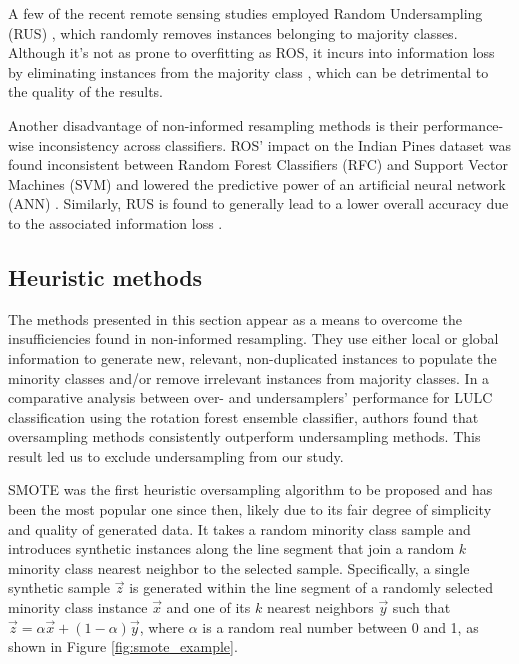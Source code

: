 \documentclass[information,article,submit,moreauthors,pdftex]{Definitions/mdpi}
\begin{document}
\begin{paracol}{2}
A few of the recent remote sensing studies employed Random Undersampling (RUS)
\citep{Ferreira2019}, which randomly removes instances belonging to majority
classes. Although it's not as prone to overfitting as ROS, it incurs into
information loss by eliminating instances from the majority class
\citep{Feng2019}, which can be detrimental to the quality of the results.

Another disadvantage of non-informed resampling methods is their
performance-wise inconsistency across classifiers. ROS' impact on the Indian
Pines dataset was found inconsistent between Random Forest Classifiers (RFC)
and Support Vector Machines (SVM) and lowered the predictive power of an
artificial neural network (ANN) \citep{Maxwell2018}. Similarly, RUS is found to
generally lead to a lower overall accuracy due to the associated information
loss \citep{Maxwell2018}.

\subsection{Heuristic methods}

The methods presented in this section appear as a means to overcome the
insufficiencies found in non-informed resampling. They use either local or
global information to generate new, relevant, non-duplicated instances to
populate the minority classes and/or remove irrelevant instances from majority
classes. In a comparative analysis between over- and undersamplers' performance
for LULC classification \citep{Feng2018} using the rotation forest ensemble
classifier, authors found that oversampling methods consistently outperform
undersampling methods. This result led us to exclude undersampling from our
study.

SMOTE \citep{Chawla2002} was the first heuristic oversampling algorithm to be
proposed and has been the most popular one since then, likely due to its fair
degree of simplicity and quality of generated data. It takes a random minority
class sample and introduces synthetic instances along the line segment that
join a random $k$ minority class nearest neighbor to the selected sample.
Specifically, a single synthetic sample $\overrightarrow{z}$ is generated
within the line segment of a randomly selected minority class
instance $\overrightarrow{x}$ and one of its $k$ nearest
neighbors $\overrightarrow{y}$ such that $\overrightarrow{z} =
\alpha\overrightarrow{x}+(1-\alpha)\overrightarrow{y}$, where $\alpha$ is a
random real number between 0 and 1, as shown in
Figure \ref{fig:smote_example}.

\end{paracol}
\end{document}
